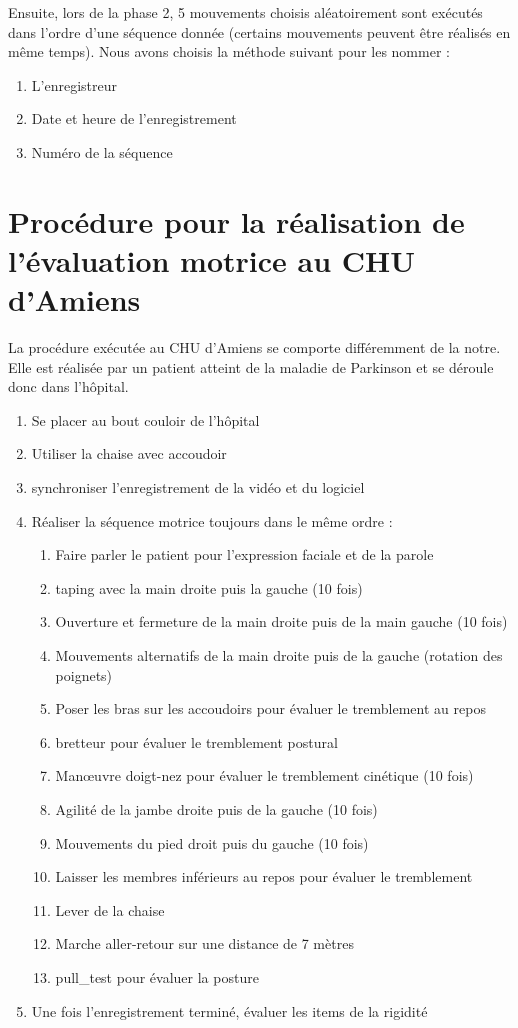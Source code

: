 \documentclass{article}
\begin{document}
Ensuite, lors de la phase 2, 5 mouvements choisis aléatoirement sont exécutés dans l'ordre d'une séquence donnée (certains mouvements peuvent être réalisés en même temps). Nous avons choisis la méthode suivant pour les nommer :
\begin{enumerate}
	\item L'enregistreur
	\item Date et heure de l'enregistrement
	\item Numéro de la séquence
\end{enumerate}

\section{Procédure pour la réalisation de l'évaluation motrice au CHU d'Amiens}
\label{proc_chu}

La procédure exécutée au CHU d'Amiens se comporte différemment de la notre. Elle est réalisée par un patient atteint de la maladie de Parkinson et se déroule donc dans l'hôpital. 
\begin{enumerate}
	\item Se placer au bout couloir de l'hôpital
	\item Utiliser la chaise avec accoudoir 
	\item synchroniser l'enregistrement de la vidéo et du logiciel
	\item Réaliser la séquence motrice toujours dans le même ordre :
	\begin{enumerate}
		\item Faire parler le patient pour l'expression faciale et de la parole
		\item \Gls{taping} avec la main droite puis la gauche (10 fois)
		\item Ouverture et fermeture de la main droite puis de la main gauche (10 fois) 
		\item Mouvements alternatifs de la main droite puis de la gauche (rotation des poignets)
		\item Poser les bras sur les accoudoirs pour évaluer le tremblement au repos
		\item \Gls{bretteur} pour évaluer le tremblement postural
		\item Man\oe{}uvre doigt-nez pour évaluer le tremblement cinétique (10 fois)
		\item Agilité de la jambe droite puis de la gauche (10 fois)
		\item Mouvements du pied droit puis du gauche (10 fois)
		\item Laisser les membres inférieurs au repos pour évaluer le tremblement
		\item Lever de la chaise
		\item Marche aller-retour sur une distance de 7 mètres
		\item \Gls{pull_test} pour évaluer la posture 
	\end{enumerate}
	\item Une fois l'enregistrement terminé, évaluer les items de la rigidité
\end{enumerate}
\end{document}
